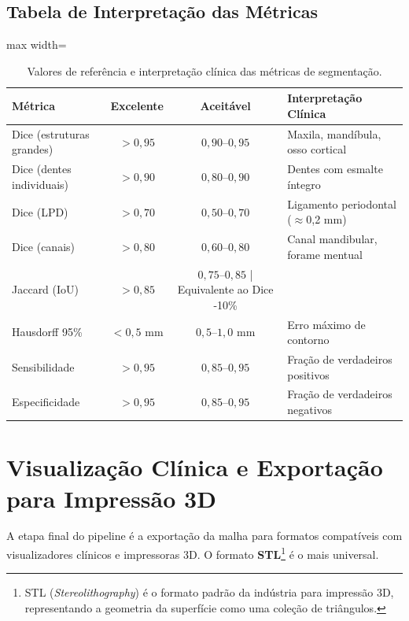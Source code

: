 \subsection{Tabela de Interpretação das Métricas}

\begin{table}[htb]
\centering
\caption{Valores de referência e interpretação clínica das métricas de segmentação.}
\label{tab:metricas-interpretacao}
\begin{adjustbox}{max width=\textwidth}
\begin{tabular}{lccp{5cm}}
\toprule
\textbf{Métrica} & \textbf{Excelente} & \textbf{Aceitável} & \textbf{Interpretação Clínica} \\
\midrule
Dice (estruturas grandes) & $>0,95$ & $0,90$--$0,95$ & Maxila, mandíbula, osso cortical \\
Dice (dentes individuais) & $>0,90$ & $0,80$--$0,90$ & Dentes com esmalte íntegro \\
Dice (LPD) & $>0,70$ & $0,50$--$0,70$ & Ligamento periodontal ($\approx$0,2 mm) \\
Dice (canais) & $>0,80$ & $0,60$--$0,80$ & Canal mandibular, forame mentual \\
Jaccard (IoU) & $>0,85$ & $0,75$--$0,85$ | Equivalente ao Dice -10\% \\
Hausdorff 95\% & $<0,5$ mm & $0,5$--$1,0$ mm & Erro máximo de contorno \\
Sensibilidade & $>0,95$ & $0,85$--$0,95$ & Fração de verdadeiros positivos \\
Especificidade & $>0,95$ & $0,85$--$0,95$ & Fração de verdadeiros negativos \\
\bottomrule
\end{tabular}
\end{adjustbox}
\end{table}

\section{Visualização Clínica e Exportação para Impressão 3D}
\label{sec:visualizacao}

A etapa final do pipeline é a exportação da malha para formatos
compatíveis com visualizadores clínicos e impressoras 3D. O formato
\textbf{STL}\footnote{STL (\textit{Stereolithography}) é o formato
padrão da indústria para impressão 3D, representando a geometria da
superfície como uma coleção de triângulos.} é o mais universal.

